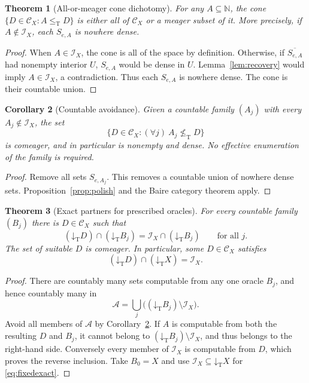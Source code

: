 \documentclass[11pt,a4paper]{article}
\newcommand{\N}{\mathbb N}
\newcommand{\leT}{\leq_{\mathrm T}}
\newcommand{\nleT}{\nleq_{\mathrm T}}
\newcommand{\CD}{\mathcal C}
\newcommand{\core}{\mathcal I}
\newcommand{\low}[1]{\mathord\downarrow_{\!\mathrm T}#1}
\newcommand{\cl}[1]{\overline{#1}}
\newtheorem{theorem}{Theorem}[section]
\newtheorem{corollary}[theorem]{Corollary}
\theoremstyle{definition}\newtheorem{definition}[theorem]{Definition}
\theoremstyle{remark}\newtheorem{remark}[theorem]{Remark}
\begin{document}
\begin{theorem}[All-or-meager cone dichotomy]\label{thm:dichotomy}
For any $A\subseteq\N$, the cone
$\{D\in\CD_X:A\leT D\}$ is either all of $\CD_X$ or a meager subset of it.
More precisely, if $A\notin\core_X$, each $S_{e,A}$ is nowhere dense.
\end{theorem}
\begin{proof}
When $A\in\core_X$, the cone is all of the space by definition. Otherwise,
if $\cl{S_{e,A}}$ had nonempty interior $U$, $S_{e,A}$ would be dense in $U$.
Lemma~\ref{lem:recovery} would imply $A\in\core_X$, a contradiction. Thus
each $S_{e,A}$ is nowhere dense. The cone is their countable union.
\end{proof}

\begin{corollary}[Countable avoidance]\label{cor:countavoid}
Given a countable family $(A_j)$ with every $A_j\notin\core_X$, the set
\[
 \{D\in\CD_X:(\forall j)\ A_j\nleT D\}
\]
is comeager, and in particular is nonempty and dense. No effective enumeration
of the family is required.
\end{corollary}
\begin{proof}
Remove all sets $S_{e,A_j}$. This removes a countable union of nowhere dense
sets. Proposition~\ref{prop:polish} and the Baire category theorem apply.
\end{proof}

\begin{theorem}[Exact partners for prescribed oracles]\label{thm:partners}
For every countable family $(B_j)$ there is $D\in\CD_X$ such that
\[
 (\low D)\cap(\low {B_j})=\core_X\cap(\low {B_j})
 \qquad\text{for all }j.
\]
The set of suitable $D$ is comeager. In particular, some $D\in\CD_X$ satisfies
\begin{equation}\label{eq:fixedexact}
 (\low D)\cap(\low X)=\core_X.
\end{equation}
\end{theorem}
\begin{proof}
There are countably many sets computable from any one oracle $B_j$, and hence
countably many in
\[
 \mathcal A=\bigcup_j\bigl((\low {B_j})\setminus\core_X\bigr).
\]
Avoid all members of $\mathcal A$ by Corollary~\ref{cor:countavoid}. If $A$ is
computable from both the resulting $D$ and $B_j$, it cannot belong to
$(\low {B_j})\setminus\core_X$, and thus belongs to the right-hand side.
Conversely every member of $\core_X$ is computable from $D$, which proves the
reverse inclusion. Take $B_0=X$ and use $\core_X\subseteq\low X$ for
\eqref{eq:fixedexact}.
\end{proof}
\end{document}
